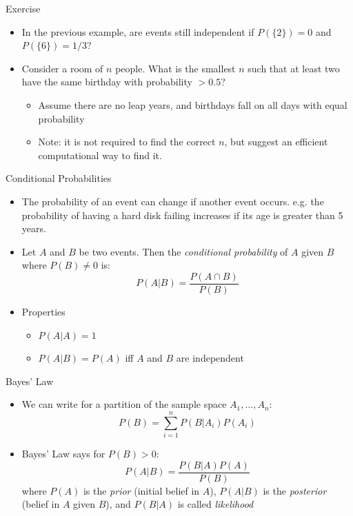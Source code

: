 \documentclass{beamer}
\begin{document}
\begin{frame}{Exercise}
\begin{itemize} 
 \item In the previous example, are events still independent if $P(\{2\}) = 0$ and $P(\{6\}) = 1/3$? 
 \item Consider a room of $n$ people. What is the smallest $n$ such that at least two have the same birthday with probability $> 0.5$? 
 \begin{itemize} 
 \item Assume there are no leap years, and birthdays fall on all days with equal probability  
 \item Note: it is not required to find the correct $n$, but suggest an efficient computational way to find it. 
 \end{itemize}
\end{itemize}
\end{frame}

\begin{frame}{Conditional Probabilities}
\begin{itemize} 
 \item The probability of an event can change if another event occurs. e.g. the probability of having a hard disk failing increases if its age is greater than 5 years. 
\item Let $A$ and $B$ be two events. Then the \emph{conditional probability} of $A$ given $B$ where $P(B) \neq 0$ is: 
\begin{displaymath} 
 P(A | B) = \frac{P(A \cap B)}{P(B)}
\end{displaymath}
\item Properties 
\begin{itemize}
\item $P(A | A) = 1$
\item $P(A | B) = P(A)$ iff $A$ and $B$ are independent 
\end{itemize}
\end{itemize} 
\end{frame}

\begin{frame}{Bayes' Law} 
\begin{itemize}
 \item We can write for a partition of the sample space $A_1, \ldots, A_n$: 
\begin{displaymath}
 P(B) = \sum_{i=1}^n P(B | A_i) P(A_i)
\end{displaymath}
\item Bayes' Law says for $P(B)>0$: 
\begin{displaymath}
 P(A | B) = \frac{P(B | A)P(A)}{P(B)}
\end{displaymath}
where $P(A)$ is the \emph{prior} (initial belief in $A$), $P(A|B)$ is the \emph{posterior} (belief in $A$ given $B$), and $P(B | A)$ is called \emph{likelihood} 
\end{itemize}
\end{frame}
\end{document}
